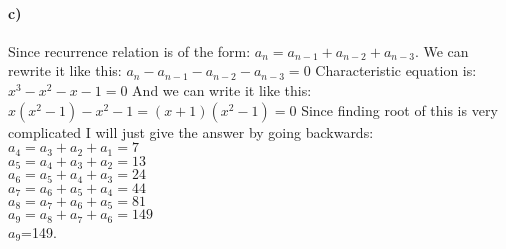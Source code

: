 \documentclass[12pt]{article}
\begin{document}
\paragraph{c)}
Since recurrence relation is of the form: $a_{n}=a_{n-1}+a_{n-2}+a_{n-3}$. We can rewrite it like this: $a_{n}-a_{n-1}-a_{n-2}-a_{n-3}=0$ Characteristic equation is: $ x^3-x^2-x-1=0$ And we can write it like this: $x(x^2-1)-x^2-1=(x+1)(x^2-1)=0$ Since finding root of this is very complicated I will just give the answer by going backwards:\\
$a_4=a_3+a_2+a_1=7$\\
$a_5=a_4+a_3+a_2=13$\\
$a_6=a_5+a_4+a_3=24$\\
$a_7=a_6+a_5+a_4=44$\\
$a_8=a_7+a_6+a_5=81$\\
$a_9=a_8+a_7+a_6=149$\\
$a_9$=149.
\end{document}
